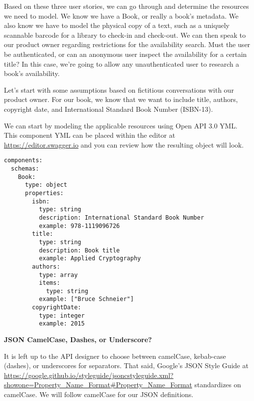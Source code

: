 Based on these three user stories, we can go through and determine the resources we need to model.  We know we have a Book, or really a book's metadata.  We also know we have to model the physical copy of a text, such as a uniquely scannable barcode for a library to check-in and check-out.  We can then speak to our product owner regarding restrictions for the availability search.  Must the user be authenticated, or can an anonymous user inspect the availability for a certain title?  In this case, we're going to allow any unauthenticated user to research a book's availability.

Let's start with some assumptions based on fictitious conversations with our product owner.  For our book, we know that we want to include title, authors, copyright date, and International Standard Book Number (ISBN-13).

\begin{minipage}{\linewidth}
We can start by modeling the applicable resources using Open API 3.0 YML.  This component YML can be placed within the editor at \url{https://editor.swagger.io} and you can review how the resulting object will look.
\begin{code}
\begin{lstlisting}[belowskip=-\baselineskip]
components:
  schemas:
    Book:
      type: object
      properties:
        isbn:
          type: string
          description: International Standard Book Number
          example: 978-1119096726
        title:
          type: string
          description: Book title
          example: Applied Cryptography
        authors:
          type: array
          items:
            type: string
          example: ["Bruce Schneier"]
        copyrightDate:
          type: integer
          example: 2015
\end{lstlisting}
\end{code}
\end{minipage}

\begin{sidebar}
\begin{center}
\textbf{JSON CamelCase, Dashes, or Underscore?}
\end{center}

It is left up to the API designer to choose between camelCase, kebab-case (dashes), or underscores for separators.  That said, Google's JSON Style Guide at \url{https://google.github.io/styleguide/jsoncstyleguide.xml?showone=Property_Name_Format#Property_Name_Format} standardizes on camelCase.  We will follow camelCase for our JSON definitions.

\end{sidebar}

